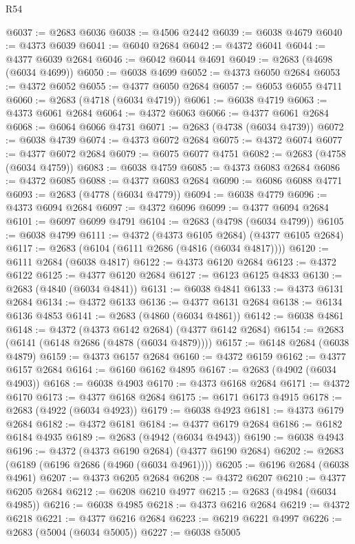\begin{lexlean}{R54}
\begin{coremodule}
@6037 := @2683 @6036
@6038 := @4506 @2442
@6039 := @6038 @4679
@6040 := @4373 @6039
@6041 := @6040 @2684
@6042 := @4372 @6041
@6044 := @4377 @6039 @2684
@6046 := @6042 @6044 @4691
@6049 := @2683 (@4698 (@6034 @4699))
@6050 := @6038 @4699
@6052 := @4373 @6050 @2684
@6053 := @4372 @6052
@6055 := @4377 @6050 @2684
@6057 := @6053 @6055 @4711
@6060 := @2683 (@4718 (@6034 @4719))
@6061 := @6038 @4719
@6063 := @4373 @6061 @2684
@6064 := @4372 @6063
@6066 := @4377 @6061 @2684
@6068 := @6064 @6066 @4731
@6071 := @2683 (@4738 (@6034 @4739))
@6072 := @6038 @4739
@6074 := @4373 @6072 @2684
@6075 := @4372 @6074
@6077 := @4377 @6072 @2684
@6079 := @6075 @6077 @4751
@6082 := @2683 (@4758 (@6034 @4759))
@6083 := @6038 @4759
@6085 := @4373 @6083 @2684
@6086 := @4372 @6085
@6088 := @4377 @6083 @2684
@6090 := @6086 @6088 @4771
@6093 := @2683 (@4778 (@6034 @4779))
@6094 := @6038 @4779
@6096 := @4373 @6094 @2684
@6097 := @4372 @6096
@6099 := @4377 @6094 @2684
@6101 := @6097 @6099 @4791
@6104 := @2683 (@4798 (@6034 @4799))
@6105 := @6038 @4799
@6111 := @4372 (@4373 @6105 @2684) (@4377 @6105 @2684)
@6117 := @2683 (@6104 (@6111 @2686 (@4816 (@6034 @4817))))
@6120 := @6111 @2684 (@6038 @4817)
@6122 := @4373 @6120 @2684
@6123 := @4372 @6122
@6125 := @4377 @6120 @2684
@6127 := @6123 @6125 @4833
@6130 := @2683 (@4840 (@6034 @4841))
@6131 := @6038 @4841
@6133 := @4373 @6131 @2684
@6134 := @4372 @6133
@6136 := @4377 @6131 @2684
@6138 := @6134 @6136 @4853
@6141 := @2683 (@4860 (@6034 @4861))
@6142 := @6038 @4861
@6148 := @4372 (@4373 @6142 @2684) (@4377 @6142 @2684)
@6154 := @2683 (@6141 (@6148 @2686 (@4878 (@6034 @4879))))
@6157 := @6148 @2684 (@6038 @4879)
@6159 := @4373 @6157 @2684
@6160 := @4372 @6159
@6162 := @4377 @6157 @2684
@6164 := @6160 @6162 @4895
@6167 := @2683 (@4902 (@6034 @4903))
@6168 := @6038 @4903
@6170 := @4373 @6168 @2684
@6171 := @4372 @6170
@6173 := @4377 @6168 @2684
@6175 := @6171 @6173 @4915
@6178 := @2683 (@4922 (@6034 @4923))
@6179 := @6038 @4923
@6181 := @4373 @6179 @2684
@6182 := @4372 @6181
@6184 := @4377 @6179 @2684
@6186 := @6182 @6184 @4935
@6189 := @2683 (@4942 (@6034 @4943))
@6190 := @6038 @4943
@6196 := @4372 (@4373 @6190 @2684) (@4377 @6190 @2684)
@6202 := @2683 (@6189 (@6196 @2686 (@4960 (@6034 @4961))))
@6205 := @6196 @2684 (@6038 @4961)
@6207 := @4373 @6205 @2684
@6208 := @4372 @6207
@6210 := @4377 @6205 @2684
@6212 := @6208 @6210 @4977
@6215 := @2683 (@4984 (@6034 @4985))
@6216 := @6038 @4985
@6218 := @4373 @6216 @2684
@6219 := @4372 @6218
@6221 := @4377 @6216 @2684
@6223 := @6219 @6221 @4997
@6226 := @2683 (@5004 (@6034 @5005))
@6227 := @6038 @5005

\end{coremodule}
\end{lexlean}
